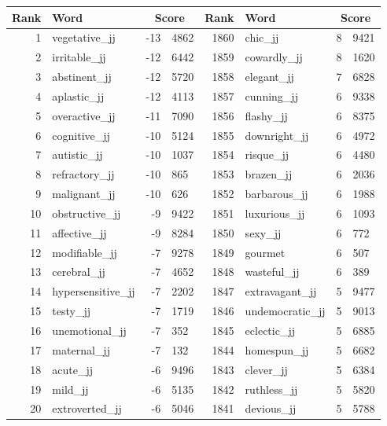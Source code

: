 \begin{table}[tbp]
    \begin{tabular}{| rlr@{.}l | rlr@{.}l |}
    \hline
    \textbf{Rank} & \textbf{Word} & \multicolumn{2}{c|}{\textbf{Score}} & \textbf{Rank} & \textbf{Word} & \multicolumn{2}{c|}{\textbf{Score}} \\
    \hline
    1 & vegetative\_jj & -13 & 4862    &    1860 & chic\_jj & 8 & 9421 \\
    2 & irritable\_jj & -12 & 6442    &    1859 & cowardly\_jj & 8 & 1620 \\
    3 & abstinent\_jj & -12 & 5720    &    1858 & elegant\_jj & 7 & 6828 \\
    4 & aplastic\_jj & -12 & 4113    &    1857 & cunning\_jj & 6 & 9338 \\
    5 & overactive\_jj & -11 & 7090    &    1856 & flashy\_jj & 6 & 8375 \\
    6 & cognitive\_jj & -10 & 5124    &    1855 & downright\_jj & 6 & 4972 \\
    7 & autistic\_jj & -10 & 1037    &    1854 & risque\_jj & 6 & 4480 \\
    8 & refractory\_jj & -10 & 865    &    1853 & brazen\_jj & 6 & 2036 \\
    9 & malignant\_jj & -10 & 626    &    1852 & barbarous\_jj & 6 & 1988 \\
    10 & obstructive\_jj & -9 & 9422    &    1851 & luxurious\_jj & 6 & 1093 \\
    11 & affective\_jj & -9 & 8284    &    1850 & sexy\_jj & 6 & 772 \\
    12 & modifiable\_jj & -7 & 9278    &    1849 & gourmet & 6 & 507 \\
    13 & cerebral\_jj & -7 & 4652    &    1848 & wasteful\_jj & 6 & 389 \\
    14 & hypersensitive\_jj & -7 & 2202    &    1847 & extravagant\_jj & 5 & 9477 \\
    15 & testy\_jj & -7 & 1719    &    1846 & undemocratic\_jj & 5 & 9013 \\
    16 & unemotional\_jj & -7 & 352    &    1845 & eclectic\_jj & 5 & 6885 \\
    17 & maternal\_jj & -7 & 132    &    1844 & homespun\_jj & 5 & 6682 \\
    18 & acute\_jj & -6 & 9496    &    1843 & clever\_jj & 5 & 6384 \\
    19 & mild\_jj & -6 & 5135    &    1842 & ruthless\_jj & 5 & 5820 \\
    20 & extroverted\_jj & -6 & 5046    &    1841 & devious\_jj & 5 & 5788 \\

\end{tabular}
\end{table}
